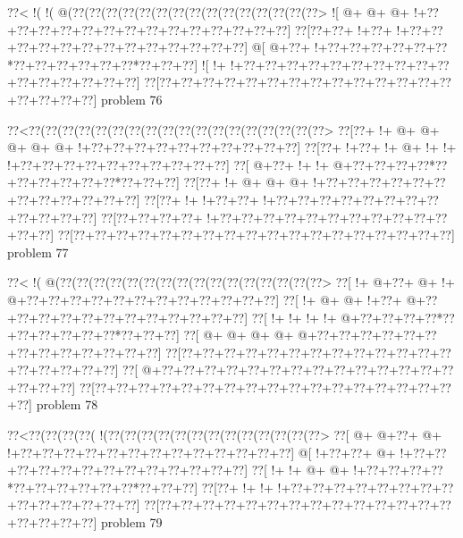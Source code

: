\vbox{\vbox{\goo
\0??<\- !(\- !(\- @(\0??(\0??(\0??(\0??(\0??(\0??(\0??(\0??(\0??(\0??(\0??(\0??(\0??(\0??(\0??>
\- ![\- @+\- @+\- @+\- !+\0??+\0??+\0??+\0??+\0??+\0??+\0??+\0??+\0??+\0??+\0??+\0??+\0??+\0??]
\0??[\0??+\0??+\- !+\0??+\- !+\0??+\0??+\0??+\0??+\0??+\0??+\0??+\0??+\0??+\0??+\0??+\0??+\0??]
\- @[\- @+\0??+\- !+\0??+\0??+\0??+\0??+\0??+\0??*\0??+\0??+\0??+\0??+\0??+\0??*\0??+\0??+\0??]
\- ![\- !+\- !+\0??+\0??+\0??+\0??+\0??+\0??+\0??+\0??+\0??+\0??+\0??+\0??+\0??+\0??+\0??+\0??]
\0??[\0??+\0??+\0??+\0??+\0??+\0??+\0??+\0??+\0??+\0??+\0??+\0??+\0??+\0??+\0??+\0??+\0??+\0??]
}
\hfil problem 76\hfil\break
}



\vbox{\vbox{\goo
\0??<\0??(\0??(\0??(\0??(\0??(\0??(\0??(\0??(\0??(\0??(\0??(\0??(\0??(\0??(\0??(\0??(\0??(\0??>
\0??[\0??+\- !+\- @+\- @+\- @+\- @+\- @+\- !+\0??+\0??+\0??+\0??+\0??+\0??+\0??+\0??+\0??+\0??]
\0??[\0??+\- !+\0??+\- !+\- @+\- !+\- !+\- !+\0??+\0??+\0??+\0??+\0??+\0??+\0??+\0??+\0??+\0??]
\0??[\- @+\0??+\- !+\- !+\- @+\0??+\0??+\0??+\0??*\0??+\0??+\0??+\0??+\0??+\0??*\0??+\0??+\0??]
\0??[\0??+\- !+\- @+\- @+\- @+\- !+\0??+\0??+\0??+\0??+\0??+\0??+\0??+\0??+\0??+\0??+\0??+\0??]
\0??[\0??+\- !+\- !+\0??+\0??+\- !+\0??+\0??+\0??+\0??+\0??+\0??+\0??+\0??+\0??+\0??+\0??+\0??]
\0??[\0??+\0??+\0??+\0??+\- !+\0??+\0??+\0??+\0??+\0??+\0??+\0??+\0??+\0??+\0??+\0??+\0??+\0??]
\0??[\0??+\0??+\0??+\0??+\0??+\0??+\0??+\0??+\0??+\0??+\0??+\0??+\0??+\0??+\0??+\0??+\0??+\0??]
}
\hfil problem 77\hfil\break
}



\vbox{\vbox{\goo
\0??<\- !(\- @(\0??(\0??(\0??(\0??(\0??(\0??(\0??(\0??(\0??(\0??(\0??(\0??(\0??(\0??(\0??(\0??>
\0??[\- !+\- @+\0??+\- @+\- !+\- @+\0??+\0??+\0??+\0??+\0??+\0??+\0??+\0??+\0??+\0??+\0??+\0??]
\0??[\- !+\- @+\- @+\- !+\0??+\- @+\0??+\0??+\0??+\0??+\0??+\0??+\0??+\0??+\0??+\0??+\0??+\0??]
\0??[\- !+\- !+\- !+\- !+\- @+\0??+\0??+\0??+\0??*\0??+\0??+\0??+\0??+\0??+\0??*\0??+\0??+\0??]
\0??[\- @+\- @+\- @+\- @+\- @+\0??+\0??+\0??+\0??+\0??+\0??+\0??+\0??+\0??+\0??+\0??+\0??+\0??]
\0??[\0??+\0??+\0??+\0??+\0??+\0??+\0??+\0??+\0??+\0??+\0??+\0??+\0??+\0??+\0??+\0??+\0??+\0??]
\0??[\- @+\0??+\0??+\0??+\0??+\0??+\0??+\0??+\0??+\0??+\0??+\0??+\0??+\0??+\0??+\0??+\0??+\0??]
\0??[\0??+\0??+\0??+\0??+\0??+\0??+\0??+\0??+\0??+\0??+\0??+\0??+\0??+\0??+\0??+\0??+\0??+\0??]
}
\hfil problem 78\hfil\break
}



\vbox{\vbox{\goo
\0??<\0??(\0??(\0??(\0??(\- !(\0??(\0??(\0??(\0??(\0??(\0??(\0??(\0??(\0??(\0??(\0??(\0??(\0??>
\0??[\- @+\- @+\0??+\- @+\- !+\0??+\0??+\0??+\0??+\0??+\0??+\0??+\0??+\0??+\0??+\0??+\0??+\0??]
\- @[\- !+\0??+\0??+\- @+\- !+\0??+\0??+\0??+\0??+\0??+\0??+\0??+\0??+\0??+\0??+\0??+\0??+\0??]
\0??[\- !+\- !+\- @+\- @+\- !+\0??+\0??+\0??+\0??*\0??+\0??+\0??+\0??+\0??+\0??*\0??+\0??+\0??]
\0??[\0??+\- !+\- !+\- !+\0??+\0??+\0??+\0??+\0??+\0??+\0??+\0??+\0??+\0??+\0??+\0??+\0??+\0??]
\0??[\0??+\0??+\0??+\0??+\0??+\0??+\0??+\0??+\0??+\0??+\0??+\0??+\0??+\0??+\0??+\0??+\0??+\0??]
}
\hfil problem 79\hfil\break
}



